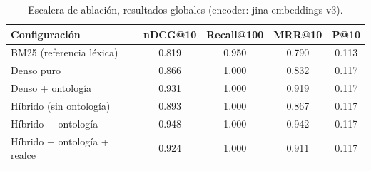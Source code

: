 \begin{table}[htbp]\centering\footnotesize
\caption{Escalera de ablación, resultados globales (encoder: jina-embeddings-v3).}
\label{tab:resultados}
\begin{tabular}{@{}lcccc@{}}
\toprule
\textbf{Configuración} & \textbf{nDCG@10} & \textbf{Recall@100} & \textbf{MRR@10} & \textbf{P@10} \\
\midrule
BM25 (referencia léxica) & 0.819 & 0.950 & 0.790 & 0.113 \\
Denso puro & 0.866 & 1.000 & 0.832 & 0.117 \\
Denso + ontología & 0.931 & 1.000 & 0.919 & 0.117 \\
Híbrido (sin ontología) & 0.893 & 1.000 & 0.867 & 0.117 \\
Híbrido + ontología & 0.948 & 1.000 & 0.942 & 0.117 \\
Híbrido + ontología + realce & 0.924 & 1.000 & 0.911 & 0.117 \\
\bottomrule
\end{tabular}
\end{table}
